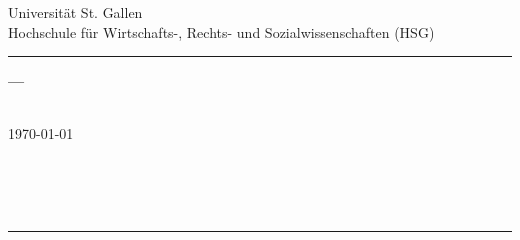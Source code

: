 \begin{center}
\Large{
Universität St. Gallen\\
Hochschule für Wirtschafts-, Rechts- und Sozialwissenschaften (HSG)
}
\vspace{.9cm}
\hrule
\vspace{2.8cm}
\Huge{\textsf{\textbf{
\theTitle
}}}
\vspace{.5cm}

\Large{\textsf{\textbf{---\\ \theSubtitle}}}\\
\vspace{2.8cm}

\Large{\today}\\
\vspace{.9cm}

\Large{
\theAuthor\\
\theAddress\\
\theZip~\theCity\\
\theMatriculation}
\vspace{2.8cm}
\hrule
\vspace{.9cm}
\Large{\theType\\
\theSupervisor\\
\theSemester}
\end{center}
\thispagestyle{empty}
